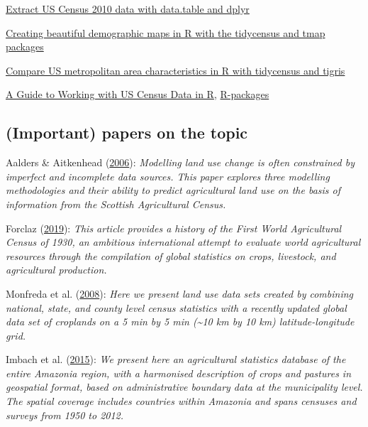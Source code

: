 \documentclass[12pt,]{article}
\begin{document}
\href{https://gl-li.netlify.com/2017/08/29/process-2010-census-data-with-data-table/}{Extract US Census 2010 data with data.table and dplyr}

\href{http://zevross.com/blog/2018/10/02/creating-beautiful-demographic-maps-in-r-with-the-tidycensus-and-tmap-packages/}{Creating beautiful demographic maps in R with the tidycensus and tmap packages}

\href{https://walkerke.github.io/2017/06/comparing-metros/}{Compare US metropolitan area characteristics in R with tidycensus and tigris}

\href{https://rconsortium.github.io/censusguide/}{A Guide to Working with US Census Data in R}, \href{https://rconsortium.github.io/censusguide/r-packages-all.html}{R-packages}

\hypertarget{important-papers-on-the-topic}{%
\subsection{(Important) papers on the topic}\label{important-papers-on-the-topic}}

Aalders \& Aitkenhead (\protect\hyperlink{ref-Aalders2006}{2006}): \emph{Modelling land use change is often constrained by imperfect and incomplete data sources. This paper explores three modelling methodologies and their ability to predict agricultural land use on the basis of information from the Scottish Agricultural Census.}

Forclaz (\protect\hyperlink{ref-Forclaz2016}{2019}): \emph{This article provides a history of the First World Agricultural Census of 1930, an ambitious international attempt to evaluate world agricultural resources through the compilation of global statistics on crops, livestock, and agricultural production.}

Monfreda et al. (\protect\hyperlink{ref-Monfreda2008}{2008}): \emph{Here we present land use data sets created by combining national, state, and county level census statistics with a recently updated global data set of croplands on a 5 min by 5 min (\textasciitilde{}10 km by 10 km) latitude-longitude grid.}

Imbach et al. (\protect\hyperlink{ref-Imbach2015}{2015}): \emph{We present here an agricultural statistics database of the entire Amazonia region, with a harmonised description of crops and pastures in geospatial format, based on administrative boundary data at the municipality level. The spatial coverage includes countries within Amazonia and spans censuses and surveys from 1950 to 2012.}
\end{document}
